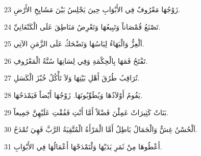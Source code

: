 \par 23 زَوْجُهَا مَعْرُوفٌ فِي الأَبْوَابِ حِينَ يَجْلِسُ بَيْنَ مَشَايِخِ الأَرْضِ.
\par 24 تَصْنَعُ قُمْصَاناً وَتَبِيعُهَا وَتَعْرِضُ مَنَاطِقَ عَلَى الْكَنْعَانِيِّ.
\par 25 اَلْعِزُّ وَالْبَهَاءُ لِبَاسُهَا وَتَضْحَكُ عَلَى الزَّمَنِ الآتِي.
\par 26 تَفْتَحُ فَمَهَا بِالْحِكْمَةِ وَفِي لِسَانِهَا سُنَّةُ الْمَعْرُوفِ.
\par 27 تُرَاقِبُ طُرُقَ أَهْلِ بَيْتِهَا وَلاَ تَأْكُلُ خُبْزَ الْكَسَلِ.
\par 28 يَقُومُ أَوْلاَدُهَا وَيُطَوِّبُونَهَا. زَوْجُهَا أَيْضاً فَيَمْدَحُهَا.
\par 29 بَنَاتٌ كَثِيرَاتٌ عَمِلْنَ فَضْلاً أَمَّا أَنْتِ فَفُقْتِ عَلَيْهِنَّ جَمِيعاً.
\par 30 اَلْحُسْنُ غِشٌّ وَالْجَمَالُ بَاطِلٌ أَمَّا الْمَرْأَةُ الْمُتَّقِيَةُ الرَّبَّ فَهِيَ تُمْدَحُ.
\par 31 أَعْطُوهَا مِنْ ثَمَرِ يَدَيْهَا وَلْتَمْدَحْهَا أَعْمَالُهَا فِي الأَبْوَابِ.


